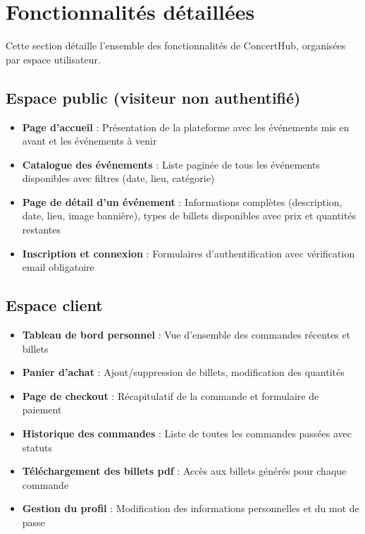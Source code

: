 \documentclass[a4paper,12pt,twoside]{report}
\begin{document}
\section{Fonctionnalités détaillées}

Cette section détaille l'ensemble des fonctionnalités de ConcertHub, organisées par espace utilisateur.

\subsection{Espace public (visiteur non authentifié)}

\begin{itemize}
    \item \textbf{Page d'accueil} : Présentation de la plateforme avec les événements mis en avant et les événements à venir
    \item \textbf{Catalogue des événements} : Liste paginée de tous les événements disponibles avec filtres (date, lieu, catégorie)
    \item \textbf{Page de détail d'un événement} : Informations complètes (description, date, lieu, image bannière), types de billets disponibles avec prix et quantités restantes
    \item \textbf{Inscription et connexion} : Formulaires d'authentification avec vérification email obligatoire
\end{itemize}

\subsection{Espace client}

\begin{itemize}
    \item \textbf{Tableau de bord personnel} : Vue d'ensemble des commandes récentes et billets
    \item \textbf{Panier d'achat} : Ajout/suppression de billets, modification des quantités
    \item \textbf{Page de checkout} : Récapitulatif de la commande et formulaire de paiement
    \item \textbf{Historique des commandes} : Liste de toutes les commandes passées avec statuts
    \item \textbf{Téléchargement des billets \gls{pdf}} : Accès aux billets générés pour chaque commande
    \item \textbf{Gestion du profil} : Modification des informations personnelles et du mot de passe
\end{itemize}
\end{document}
